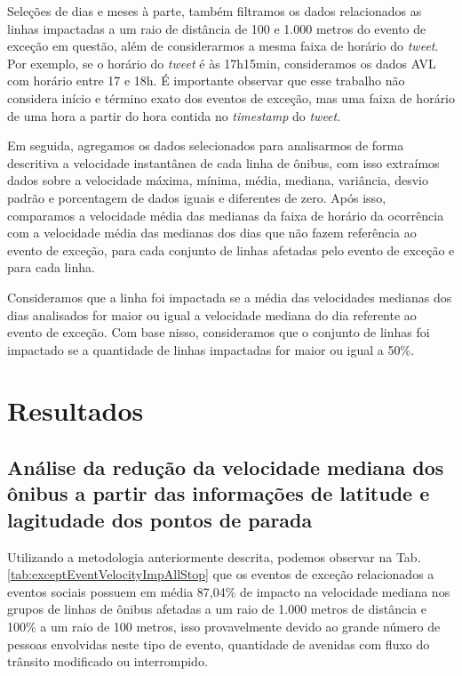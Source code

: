 \documentclass[
	12pt,				%
	oneside,			%
	a4paper,			%
	english,			%
	brazil				%
	]{abntex2ppgsi}
\begin{document}
{{Seleções de dias e meses à parte, também filtramos os dados relacionados as linhas impactadas a um raio de distância de 100 e 1.000 metros do evento de exceção em questão, além de considerarmos a mesma faixa de horário do \textit{tweet}. Por exemplo, se o horário do \textit{tweet} é às 17h15min, consideramos os dados AVL com horário entre 17 e 18h. É importante observar que esse trabalho não considera início e término exato dos eventos de exceção, mas uma faixa de horário de uma hora a partir do hora contida no \textit{timestamp}  do \textit{tweet}.

Em seguida, agregamos os dados selecionados para analisarmos  de forma descritiva a velocidade instantânea de cada linha de ônibus, com isso extraímos dados sobre a velocidade máxima, mínima, média, mediana, variância, desvio padrão e porcentagem de dados iguais e diferentes de zero. Após isso, comparamos a velocidade média das medianas da faixa de horário da ocorrência com a velocidade média das medianas dos dias que não fazem referência ao evento de exceção, para cada conjunto de linhas afetadas pelo evento de exceção e para cada linha.

Consideramos que a linha foi impactada se a média das velocidades medianas dos dias analisados for maior ou igual a velocidade mediana do dia referente ao evento de exceção. Com base nisso, consideramos que o conjunto de linhas foi impactado se a quantidade de linhas impactadas for maior ou igual a 50\%.

\section*{Resultados}

\subsection*{Análise da redução da velocidade mediana dos ônibus a partir das informações de latitude e lagitudade dos pontos de parada}
\label{stopsAnalysis}

Utilizando a metodologia anteriormente descrita, podemos observar na Tab. \ref{tab:exceptEventVelocityImpAllStop} que os eventos de exceção relacionados a eventos sociais possuem em média 87,04\% de impacto na velocidade mediana nos grupos de linhas de ônibus afetadas a um raio de 1.000 metros de distância e 100\% a um raio de 100 metros, isso provavelmente devido ao grande número de pessoas envolvidas neste tipo de evento, quantidade de avenidas com fluxo do trânsito modificado ou interrompido. 

}}
\end{document}
